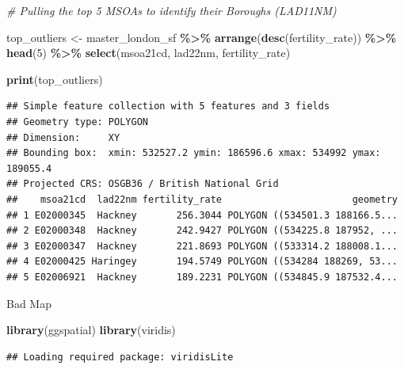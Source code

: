 \documentclass[
]{article}
\newenvironment{Shaded}{\begin{snugshade}}{\end{snugshade}}
\newcommand{\CommentTok}[1]{\textcolor[rgb]{0.56,0.35,0.01}{\textit{#1}}}
\newcommand{\DecValTok}[1]{\textcolor[rgb]{0.00,0.00,0.81}{#1}}
\newcommand{\FunctionTok}[1]{\textcolor[rgb]{0.13,0.29,0.53}{\textbf{#1}}}
\newcommand{\NormalTok}[1]{#1}
\newcommand{\OtherTok}[1]{\textcolor[rgb]{0.56,0.35,0.01}{#1}}
\newcommand{\SpecialCharTok}[1]{\textcolor[rgb]{0.81,0.36,0.00}{\textbf{#1}}}
\begin{document}
\begin{Shaded}
\begin{Highlighting}[]
\CommentTok{\# Pulling the top 5 MSOAs to identify their Boroughs (LAD11NM)}

\NormalTok{top\_outliers }\OtherTok{\textless{}{-}}\NormalTok{ master\_london\_sf }\SpecialCharTok{\%\textgreater{}\%}
  \FunctionTok{arrange}\NormalTok{(}\FunctionTok{desc}\NormalTok{(fertility\_rate)) }\SpecialCharTok{\%\textgreater{}\%}
  \FunctionTok{head}\NormalTok{(}\DecValTok{5}\NormalTok{) }\SpecialCharTok{\%\textgreater{}\%}
  \FunctionTok{select}\NormalTok{(msoa21cd,}
\NormalTok{         lad22nm,}
\NormalTok{         fertility\_rate)}

\FunctionTok{print}\NormalTok{(top\_outliers)}
\end{Highlighting}
\end{Shaded}

\begin{verbatim}
## Simple feature collection with 5 features and 3 fields
## Geometry type: POLYGON
## Dimension:     XY
## Bounding box:  xmin: 532527.2 ymin: 186596.6 xmax: 534992 ymax: 189055.4
## Projected CRS: OSGB36 / British National Grid
##    msoa21cd  lad22nm fertility_rate                       geometry
## 1 E02000345  Hackney       256.3044 POLYGON ((534501.3 188166.5...
## 2 E02000348  Hackney       242.9427 POLYGON ((534225.8 187952, ...
## 3 E02000347  Hackney       221.8693 POLYGON ((533314.2 188008.1...
## 4 E02000425 Haringey       194.5749 POLYGON ((534284 188269, 53...
## 5 E02006921  Hackney       189.2231 POLYGON ((534845.9 187532.4...
\end{verbatim}

Bad Map

\begin{Shaded}
\begin{Highlighting}[]
\FunctionTok{library}\NormalTok{(ggspatial)}
\FunctionTok{library}\NormalTok{(viridis)}
\end{Highlighting}
\end{Shaded}

\begin{verbatim}
## Loading required package: viridisLite
\end{verbatim}
\end{document}
